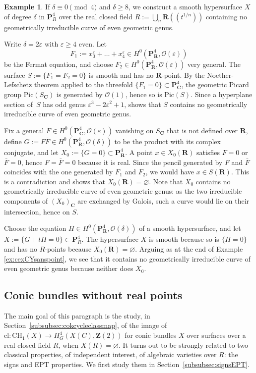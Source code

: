 \documentclass[JEP,XML,SOM,Unicode]{cedram}
\newcommand{\lpr}{(\!(}
\newcommand{\rpr}{)\!)}
\theoremstyle{plain}
\theoremstyle{definition}
\newtheorem{example}[thm]{Example}
\numberwithin{equation}{section}
\newcommand{\cl}{{\mathrm{cl}}}
\newcommand{\sO}{{\mathscr O}}
\renewcommand{\C}{{\mathbf C}}
\renewcommand{\P}{{\mathbf P}}
\newcommand{\R}{{\mathbf R}}
\newcommand{\Z}{{\mathbf Z}}
\newcommand{\CH}{\mathrm{CH}}
\newcommand{\Pic}{\mathrm{Pic}}
\begin{document}
\begin{example}\label{ex:cexhyp}
If $\delta\equiv 0\pmod 4$ and $\delta\geq 8$, we construct a smooth hypersurface $X$ of degree $\delta$ in $\P^4_R$ over the real closed field $R:=\bigcup_n\R\lpr t^{1/n}\rpr$ containing no geometrically irreducible curve of even geometric genus.

Write $\delta=2\varepsilon$ with $\varepsilon\geq 4$ even. Let
\[
F_1:=x_0^{\varepsilon}+\dots+x_4^{\varepsilon}\in H^0(\P^4_\R,\sO(\varepsilon))
\]
be the Fermat equation, and choose $F_2\in H^0(\P^4_\R,\sO(\varepsilon))$ very general.
The surface $S:=\{F_1=F_2=0\}$ is smooth and has no $\R$-point. By the Noether-Lefschetz theorem \cite[Th.\,15.33]{voisinbook} applied to the threefold $\{F_1=0\}\subset\P^4_{\C}$, the geometric Picard group $\Pic(S_{\C})$ is generated by $\sO(1)$, hence so is $\Pic(S)$. Since a hyperplane section of~$S$ has odd genus $\varepsilon^3-2\varepsilon^2+1$, \cite[Th.\,\ref*{BW1-th:phi}]{BW1} shows that $S$ contains no geometrically irreducible curve of even geometric genus.

Fix a general $F\in H^0(\P^4_\C,\sO(\varepsilon))$ vanishing on $S_{\C}$ that is not defined over $\R$, define $G:=F\bar{F}\in H^0(\P^4_\R,\sO(\delta))$ to be the product with its complex conjugate, and let $X_0:=\{G=0\}\subset\P^4_{\R}$. A point $x\in X_0(\R)$ satisfies $F=0$ or $\bar{F}=0$, hence $F=\bar{F}=0$ because it is real. Since the pencil generated by $F$ and $\bar{F}$ coincides with the one generated by $F_1$ and $F_2$, we would have $x\in S(\R)$. This is a contradiction and shows that $X_0(\R)=\varnothing$. Note that $X_0$ contains no geometrically irreducible curve of even geometric genus:
as the two irreducible components of $(X_0)_\C$ are exchanged by Galois,
such a curve would lie on their intersection, hence on $S$.

Choose the equation $H\in H^0(\P^4_\R,\sO(\delta))$ of a smooth hypersurface, and let $X:=\{G+tH=0\}\subset \P^4_R$.
The hypersurface $X$ is smooth because so is $\{H=0\}$ and has no $R$-points because $X_0(\R)=\varnothing$. Arguing as at the end of Example \ref{ex:cexCYsanspoint},
we see that it contains no geometrically irreducible curve of even geometric genus because neither does $X_0$.
\end{example}

\subsection{Conic bundles without real points}
\label{subsec:conic bundles non arch}
The main goal of this paragraph is the study, in Section~\ref{subsubsec:cokcycleclassmap}, of the image of $\cl:\CH_1(X)\to H^4_G(X(C),\Z(2))$ for conic bundles $X$ over surfaces over a real closed field $R$, when $X(R)=\varnothing$. It turns out to be strongly related to two classical properties, of independent interest, of algebraic varieties over $R$: the signs and EPT properties.
We first study them in Section~\ref{subsubsec:signsEPT}.
\end{document}
